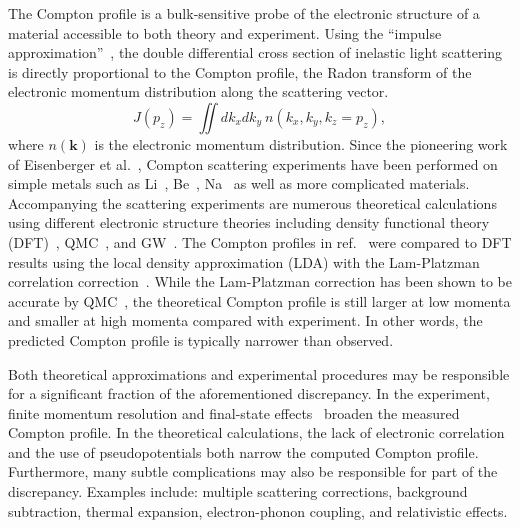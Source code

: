 \documentclass[aps,prb,showpacs,preprintnumbers,amsmath,amssymb,superscriptaddress,twocolumn]{revtex4-1}
\newcommand{\bs}{\boldsymbol}
\begin{document}
The Compton profile is a bulk-sensitive probe of the electronic structure of a material accessible to both theory and experiment. Using the ``impulse approximation''~\cite{Eisenberger1970}, the double differential cross section of inelastic light scattering is directly proportional to the Compton profile, the Radon transform of the electronic momentum distribution along the scattering vector. %
\begin{equation}
J(p_z) = \iint dk_x dk_y ~ n(k_x, k_y, k_z=p_z),
\end{equation}
where $n(\bs{k})$ is the electronic momentum distribution.
Since the pioneering work of Eisenberger et al.~\cite{Eisenberger1970,Eisenberger1972}, Compton scattering experiments have been performed on simple metals such as Li~\cite{Sakurai1995, Schulke1996,Chen1999,Sternemann2001,Tanaka2001}, Be~\cite{Hamalainen1996,Huotari2000}, Na~\cite{Huotari2010} as well as more complicated materials. Accompanying the scattering experiments are numerous theoretical calculations using different electronic structure theories including density functional theory (DFT)~\cite{Sakurai1995,Schulke1996,Tanaka2001,Jarlborg1998,Baruah1999,Bross2005,Makkonen2005,Klevak2016,Sekania2018}, QMC~\cite{Filippi1999,Huotari2010}, and GW~\cite{Yasunori1997,Schulke1999,Eguiluz2000,Olevano2012}.
The Compton profiles in ref.~\cite{Sakurai1995,Schulke1996} were compared to DFT results using the local density approximation (LDA) with the Lam-Platzman correlation correction~\cite{Lam1974}.
While the Lam-Platzman correction has been shown to be accurate by QMC~\cite{Filippi1999,Schulke2001,Bross2005}, the theoretical Compton profile is still larger at low momenta and smaller at high momenta compared with experiment. In other words, the predicted Compton profile is typically narrower than observed.

Both theoretical approximations and experimental procedures may be responsible for a significant fraction of the aforementioned discrepancy. In the experiment, finite momentum resolution and final-state effects~\cite{Sternemann2000,Soininen2001} broaden the measured Compton profile. In the theoretical calculations, the lack of electronic correlation and the use of pseudopotentials both narrow the computed Compton profile. Furthermore, many subtle complications may also be responsible for part of the discrepancy. Examples include: multiple scattering corrections, background subtraction, thermal expansion, electron-phonon coupling, and relativistic effects.
\end{document}
